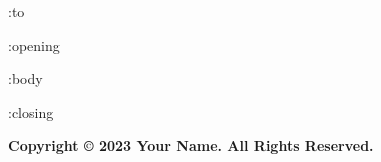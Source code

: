 \documentclass[version=last, Briefvorlage]{scrlttr2}
\begin{document}
%
    \begin{letter}{ :to }
    \opening{ :opening }
    :body
    \closing{ :closing }


    \newpage
    \thispagestyle{empty} %
\null
\vfill
\begin{center}
\textbf{Copyright © 2023 Your Name. All Rights Reserved.}
\end{center}
\vfill


    \end{letter}
%
\end{document}
